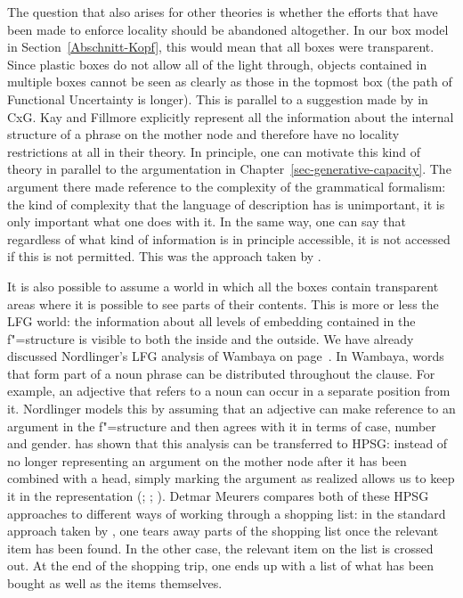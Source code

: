 The question that also arises for other theories is whether the efforts that have been made to enforce locality should be abandoned altogether.
In our box model in Section~\ref{Abschnitt-Kopf}, this would mean that all boxes were transparent. Since plastic boxes do not allow
all of the light through, objects contained in multiple boxes cannot be seen as clearly as those in the topmost box (the path
of Functional Uncertainty is longer). This is parallel to a suggestion made by
\citet{KF99a} in CxG\indexcxg. Kay and Fillmore explicitly represent all the information about the internal structure of a phrase on the mother
node and therefore have no locality restrictions at all in their theory. In principle, one can
motivate this kind of theory in parallel to the argumentation in Chapter~\ref{sec-generative-capacity}. The argument
there made reference to the complexity of the grammatical formalism: the kind of complexity that the
language of description has is unimportant, it is only important what one does with it. In the same way, one can say that regardless of what kind of information
is  in principle accessible, it is not accessed if this is not permitted. This was the approach taken by \citet[--145]{ps}.

It\label{page-Bender-Wambaya-two} is also possible to assume a world in which all the boxes contain transparent areas where it is possible to see parts of their contents.
This is more or less the LFG world\indexlfg: the information about all levels of embedding contained in the f"=structure is
visible to both the inside and the outside. We have already discussed Nordlinger's \citeyearpar{Nordlinger98a} LFG analysis of Wambaya 
on page~\pageref{Seite-Bender-Wambaya}.
In Wambaya, words that form part of a noun phrase can be distributed throughout the clause. For example, an adjective that refers to a noun
can occur in a separate position from it. Nordlinger models this by assuming that an adjective can make reference to an argument in the f"=structure
and then agrees with it in terms of case, number and gender. \citet{Bender2008a} has shown that this analysis can be transferred to HPSG\indexhpsg:
instead of no longer representing an argument on the mother node after it has been combined with a head, simply marking the argument as realized
allows us to keep it in the representation (\citealp{Meurers99b}; \citealp{Prze99};
\citealp[Section~17.4]{MuellerLehrbuch1}). Detmar Meurers compares both of these HPSG approaches to different ways of working through a shopping list: in the standard approach taken by \citet{ps2},
one tears away parts of the shopping list once the relevant item has been found. In the other case, the relevant item on the list is crossed out.
At the end of the shopping trip, one ends up with a list of what has been bought as well as the items themselves.
  
